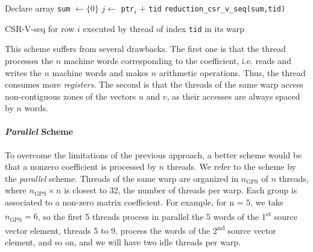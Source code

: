 \documentclass[runningheads,orivec]{llncs}
\begin{document}
\begin{algorithm}[H]
 \small 
 \BlankLine
 Declare array \texttt{sum} $\leftarrow \{0\}$
 $j\leftarrow$ \texttt{ptr}\textsubscript{$i$} $+$ \texttt{tid}\;
   \texttt{reduction\_csr\_v\_seq(sum,tid)}\;
 \caption{\small CSR-V-seq for row $i$ executed by thread of index \texttt{tid} in its warp}
 \label{algo::csr vector-sequential}
\end{algorithm}



This scheme suffers from several drawbacks. The first one is that the thread processes the $n$ machine words corresponding to the coefficient, i.e. reads and writes the $n$ machine words and makes $n$ arithmetic operations. Thus, the thread consumes more \textit{registers}. The second is that the threads of the same warp access non-contiguous zones of the vectors $u$ and $v$, as their accesses are always spaced by $n$ words.

\vspace*{-0.25cm}
\paragraph{\bf \textit{Parallel} Scheme}

To overcome the limitations of the previous approach, a better scheme would be that a nonzero coefficient is processed by $n$ threads. We refer to the scheme by the \textit{parallel} scheme. Threads of the same warp are organized in $n_{\mathrm{GPS}}$ of $n$ threads, where $ n_{\mathrm{GPS}} \times n$ is closest to 32, the number of threads per warp. Each group is associated to a non-zero matrix coefficient. For example, for n = $5$, we take $n_{\mathrm{GPS}} = 6$, so the first 5 threads process in parallel the 5 words of the 1\textsuperscript{st} source vector element, threads 5 to 9, process the words of the 2\textsuperscript{nd} source vector element, and so on, and we will have two idle threads per warp.
\end{document}
